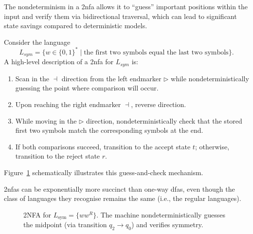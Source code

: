 \begin{remark}
The nondeterminism in a \gls{2nfa} allows it to “guess” important positions within the input and verify them via bidirectional traversal, which can lead to significant state savings compared to deterministic models.
\end{remark}

\begin{example}
Consider the language 
\[
L_{sym} = \{ w \in \{0,1\}^* \mid \text{the first two symbols equal the last two symbols} \}.
\]
A high-level description of a \gls{2nfa} for \(L_{sym}\) is:
\begin{enumerate}
    \item Scan in the \(\dashv\) direction from the left endmarker \(\triangleright\) while nondeterministically guessing the point where comparison will occur.
    \item Upon reaching the right endmarker \(\dashv\), reverse direction.
    \item While moving in the \(\triangleright\) direction, nondeterministically check that the stored first two symbols match the corresponding symbols at the end.
    \item If both comparisons succeed, transition to the accept state \(t\); otherwise, transition to the reject state \(r\).
\end{enumerate}
Figure~\ref{fig:2nfa-example} schematically illustrates this guess-and-check mechanism.
\end{example}

\begin{observation}
\glspl{2nfa} can be exponentially more succinct than one-way \glspl{dfa}, even though the class of languages they recognise remains the same (i.e., the regular languages).
\end{observation}

\begin{figure}[ht]
    \centering  
    \caption{2NFA for \(L_{\text{sym}} = \{ww^R\}\). The machine nondeterministically guesses the midpoint (via transition \(q_2 \to q_0\)) and verifies symmetry.}
    \label{fig:2nfa-example}
\end{figure}

